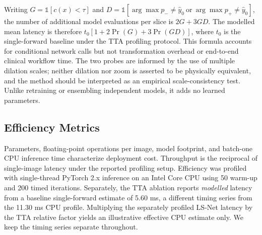 Writing $G=\mathbb{1}[c(x)<\tau]$ and $D=\mathbb{1}[\arg\max p_-\ne\hat y_0\ \mathrm{or}\ \arg\max p_+\ne\hat y_0]$, the number of additional model evaluations per slice is $2G+3GD$. The modelled mean latency is therefore $t_0[1+2\Pr(G)+3\Pr(GD)]$, where $t_0$ is the single-forward baseline under the TTA profiling protocol. This formula accounts for conditional network calls but not transformation overhead or end-to-end clinical workflow time. The two probes are informed by the use of multiple dilation scales; neither dilation nor zoom is asserted to be physically equivalent, and the method should be interpreted as an empirical scale-consistency test. Unlike retraining or ensembling independent models, it adds no learned parameters.

\subsection{Efficiency Metrics}
Parameters, floating-point operations per image, model footprint, and batch-one CPU inference time characterize deployment cost. Throughput is the reciprocal of single-image latency under the reported profiling setup. Efficiency was profiled with single-thread PyTorch 2.x inference on an Intel Core CPU using 50 warm-up and 200 timed iterations. Separately, the TTA ablation reports \emph{modelled} latency from a baseline single-forward estimate of 5.60 ms, a different timing series from the 11.30 ms CPU profile. Multiplying the separately profiled LS-Net latency by the TTA relative factor yields an illustrative effective CPU estimate only. We keep the timing series separate throughout.
